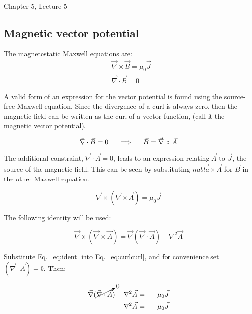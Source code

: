 \documentclass[12pt]{article}
\begin{document}
\begin{flushright} {\color{blue} Chapter 5, Lecture 5} \end{flushright}
\begin{flushleft}

\subsection*{\bf \color{myblue} Magnetic vector potential}

The magnetostatic Maxwell equations are:
\begin{equation*}
\begin{aligned}
&  \vec{\nabla} \times \vec{B} = \mu_{0}\vec{J}  \\ 
&  \vec{\nabla} \cdot \vec{B}  = 0
\end{aligned}
\end{equation*}

A valid form of an expression for the vector potential is found using the source-free Maxwell equation.  Since the divergence of a curl is always zero, then the magnetic field can be written as the curl of a vector function, (call it the magnetic vector potential).

\[
\vec{\nabla} \cdot \vec{B} = 0  \hspace{.2in} \Longrightarrow \hspace{.2in} \vec{B} = \vec{\nabla}  \times \vec{A}
\]

The additional constraint, $\vec{\nabla} \cdot \vec{A} =0$, leads to an expression relating $\vec{A}$ to $\vec{J}$, the source of the magnetic field.  This can be seen by substituting $\vec{nabla} \times \vec{A}$ for $\vec{B}$ in the other Maxwell equation.

\begin{equation}
\vec{\nabla} \times (\vec{\nabla} \times \vec{A}) = \mu_{0}\vec{J}
\label{eq:curlcurl}
\end{equation}

The following identity will be used:

\begin{equation}
\vec{\nabla} \times (\vec{\nabla} \times \vec{A}) = \vec{\nabla}(\vec{\nabla} \cdot \vec{A}) -\nabla^{2}\vec{A}
\label{eq:ident}
\end{equation}

Substitute Eq.~\ref{eq:ident} into  Eq.~\ref{eq:curlcurl}, and for convenience set $(\vec{\nabla} \cdot \vec{A})=0$.  Then:

\begin{eqnarray*}
\vec{\nabla}(\cancelto{0}{\vec{\nabla} \cdot \vec{A}}) - \nabla^{2} \vec{A} & = & \mu_{0}\vec{J} \\
\nabla^{2} \vec{A} & = & -\mu_{0}\vec{J}
\end{eqnarray*}


\end{flushleft}
\end{document}
